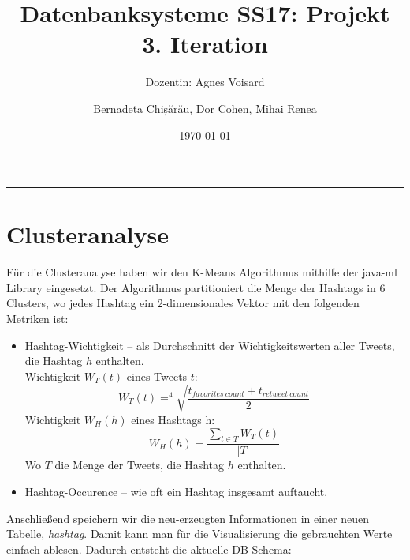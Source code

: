 \documentclass[paper=a4, english, ngerman, romanian]{scrartcl}
\begin{document}
\begin{titlepage}
	\title{Datenbanksysteme SS17: Projekt\\ 3. Iteration}	
	\subtitle{Dozentin: Agnes Voisard}
	\author{Bernadeta Chișărău, Dor Cohen, Mihai Renea}
	\date{\normalsize \today}
\end{titlepage}

\maketitle								%
\vspace*{-8cm}							%

\vspace{7cm}							%
\rule{\linewidth}{0.8pt}				%
	\section{Clusteranalyse}
		Für die Clusteranalyse haben wir den K-Means Algorithmus mithilfe der java-ml Library eingesetzt. Der Algorithmus partitioniert die Menge der Hashtags in 6 Clusters, wo jedes Hashtag ein 2-dimensionales Vektor mit den folgenden Metriken ist:
		\begin{itemize}
			\item Hashtag-Wichtigkeit -- als Durchschnitt der Wichtigkeitswerten aller Tweets, die Hashtag $h$ enthalten.\\
			Wichtigkeit $W_T(t)$ eines Tweets $t$:\\
			\begin{equation*}
				W_T(t) = ^4\sqrt{\frac{t_{favorites\ count} + t_{retweet\ count}}{2}}
			\end{equation*}
			Wichtigkeit $W_H(h)$ eines Hashtags h:
			\begin{equation*}
				W_H(h) = \frac{\sum_{t \in T} W_T(t)}{|T|}
			\end{equation*}
			Wo $T$ die Menge der Tweets, die Hashtag $h$ enthalten.
			
			\item Hashtag-Occurence -- wie oft ein Hashtag insgesamt auftaucht.
		\end{itemize}
		
		Anschließend speichern wir die neu-erzeugten Informationen in einer neuen Tabelle, \textit{hashtag}. Damit kann man für die Visualisierung die gebrauchten Werte einfach ablesen. Dadurch entsteht die aktuelle DB-Schema:
		
\end{document}
